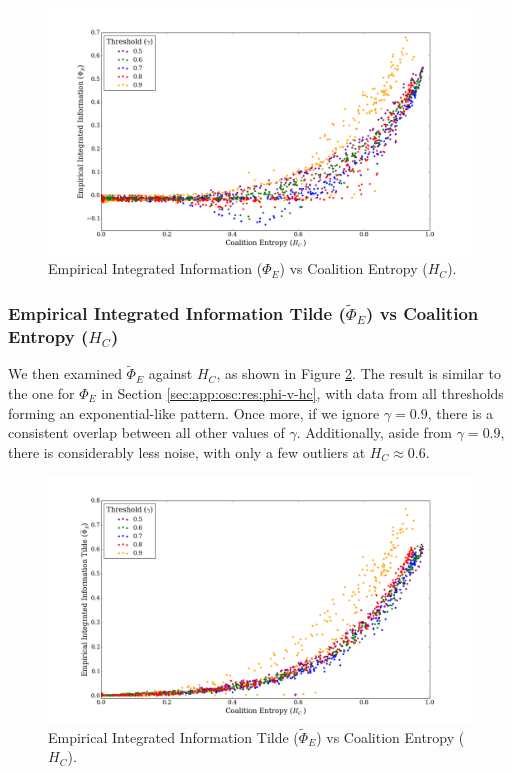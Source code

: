 \documentclass[a4paper,11pt]{article}
\begin{document}
\begin{figure}[H]
\begin{center}
\includegraphics[scale = 0.35]{figures/phi_vs_hc_multi}
\caption{
		Empirical Integrated Information ($\Phi_E$) vs Coalition Entropy ($H_C$).
	\label{fig:phi-vs-hc-multi}
}
\end{center}
\end{figure}

\subsubsection{Empirical Integrated Information Tilde ($\widetilde{\Phi}_{E}$) vs Coalition Entropy ($H_C$)}
\label{sec:app:osc:res:phi-tilde-v-hc}

We then examined $\widetilde{\Phi}_{E}$ against $H_C$, as shown in Figure \ref{fig:phi-tilde-vs-hc-multi}. The result is similar to the one for $\Phi_E$ in Section \ref{sec:app:osc:res:phi-v-hc}, with data from all thresholds forming an exponential-like pattern. Once more, if we ignore $\gamma = 0.9$, there is a consistent overlap between all other values of $\gamma$. Additionally, aside from $\gamma = 0.9$, there is considerably less noise, with only a few outliers at $H_C \approx 0.6$.

\begin{figure}[H]
\begin{center}
\includegraphics[scale = 0.35]{figures/phi_tilde_vs_hc_multi}
\caption{
	Empirical Integrated Information Tilde ($\widetilde{\Phi}_E$) vs Coalition Entropy ($H_C$).
	\label{fig:phi-tilde-vs-hc-multi}
}
\end{center}
\end{figure}
\end{document}
